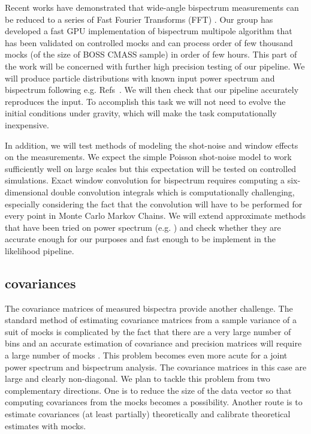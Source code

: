 Recent works have demonstrated that wide-angle bispectrum measurements can
be reduced to a series of Fast Fourier Transforms (FFT)
\cite{2015PhRvD..92h3532S,2018arXiv180302132S}. Our group has developed a fast
GPU implementation of bispectrum multipole algorithm that has been validated on
controlled mocks and can process order of few thousand mocks (of the size of
BOSS CMASS sample) in order of few hours. This part of the work will be
concerned with further high precision testing of our pipeline. We will produce
particle distributions with known input power spectrum and bispectrum following
e.g. Refs~\cite{2012PhRvD..85h3002S,2012PhRvD..86l3524R,2010JCAP...10..022W}.
We will then check that our pipeline accurately reproduces the input. To
accomplish this task we will not need to evolve the initial conditions under
gravity, which will make the task computationally inexpensive. 

In addition, we will test methods of modeling the shot-noise and window effects
on the measurements. We expect the simple Poisson shot-noise model to work
sufficiently well on large scales but this expectation will be tested on
controlled simulations. Exact window convolution for bispectrum requires
computing a six-dimensional double convolution integrals which is
computationally challenging, especially considering the fact that the
convolution will have to be performed for every point in Monte Carlo Markov
Chains. We will extend approximate methods that have been tried on power
spectrum (e.g. \cite{2017MNRAS.464.3121W}) and check whether they are accurate
enough for our purposes and fast enough to be implement in the likelihood
pipeline. 

\subsection*{covariances}

The covariance matrices of measured bispectra provide another challenge. The
standard method of estimating covariance matrices from a sample variance of a
suit of mocks is complicated by the fact that there are a very large
number of bins and an accurate estimation of covariance and precision matrices
will require a large number of mocks
\cite{2006MNRAS.371.1188H,2007A&A...464..399H,2013MNRAS.432.1928T,2013PhRvD..88f3537D,2014MNRAS.439.2531P,2014MNRAS.442.2728T}.
This problem becomes even more acute for a joint power spectrum and bispectrum
analysis. The covariance matrices in this case are large and clearly
non-diagonal.  We plan to tackle this problem from two complementary
directions. One is to reduce the size of the data vector so that computing
covariances from the mocks becomes a possibility. Another route is to estimate
covariances (at least partially) theoretically and calibrate theoretical
estimates with mocks. 

